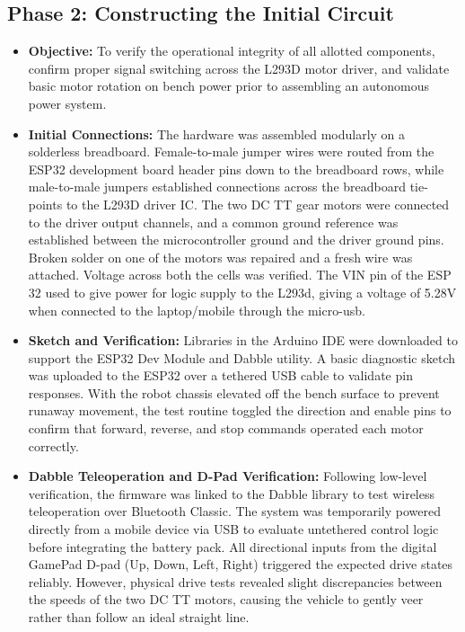 \documentclass[journal,12pt,onecolumn]{IEEEtran}
\begin{document}
\subsection*{\textbf{Phase 2}: Constructing the Initial Circuit}
\begin{itemize}
	\item \textbf{Objective:} To verify the operational integrity of all allotted components, confirm proper signal switching across the L293D motor driver, and validate basic motor rotation on bench power prior to assembling an autonomous power system.
	
	\item \textbf{Initial Connections:} The hardware was assembled modularly on a solderless breadboard. Female-to-male jumper wires were routed from the ESP32 development board header pins down to the breadboard rows, while male-to-male jumpers established connections across the breadboard tie-points to the L293D driver IC. The two DC TT gear motors were connected to the driver output channels, and a common ground reference was established between the microcontroller ground and the driver ground pins. Broken solder on one of the motors was repaired and a fresh wire was attached. Voltage across both the cells was verified. The VIN pin of the ESP 32 used to give power for logic supply to the L293d, giving a voltage of 5.28V when connected to the laptop/mobile through the micro-usb.
	
	\item \textbf{Sketch and Verification:} Libraries in the Arduino IDE were downloaded to support the ESP32 Dev Module and Dabble utility. A basic diagnostic sketch was uploaded to the ESP32 over a tethered USB cable to validate pin responses. With the robot chassis elevated off the bench surface to prevent runaway movement, the test routine toggled the direction and enable pins to confirm that forward, reverse, and stop commands operated each motor correctly.

    \item \textbf{Dabble Teleoperation and D-Pad Verification:} Following low-level verification, the firmware was linked to the Dabble library to test wireless teleoperation over Bluetooth Classic. The system was temporarily powered directly from a mobile device via USB to evaluate untethered control logic before integrating the battery pack. All directional inputs from the digital GamePad D-pad (Up, Down, Left, Right) triggered the expected drive states reliably. However, physical drive tests revealed slight discrepancies between the speeds of the two DC TT motors, causing the vehicle to gently veer rather than follow an ideal straight line.
\end{itemize}
\end{document}
